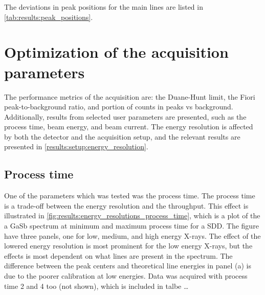 The deviations in peak positions for the main lines are listed in \cref{tab:results:peak_positions}.






















\section{Optimization of the acquisition parameters}
\label{results:acquisition_parameters}

The performance metrics of the acquisition are: the Duane-Hunt limit, the Fiori peak-to-background ratio, and portion of counts in peaks vs background.
Additionally, results from selected user parameters are presented, such as the process time, beam energy, and beam current.
The energy resolution is affected by both the detector and the acquisition setup, and the relevant results are presented in \cref{results:setup:energy_resolution}.



\subsection{Process time}
\label{results:process_time}

One of the parameters which was tested was the process time.
The process time is a trade-off between the energy resolution and the throughput.
This effect is illustrated in \cref{fig:results:energy_resolutions_process_time}, which is a plot of the a GaSb spectrum at minimum and maximum process time for a SDD.
The figure have three panels, one for low, medium, and high energy X-rays.
The effect of the lowered energy resolution is most prominent for the low energy X-rays, but the effects is most dependent on what lines are present in the spectrum.
The difference between the peak centers and theoretical line energies in panel (a) is due to the poorer calibration at low energies.
Data was acquired with process time 2 and 4 too (not shown), which is included in talbe \dots


